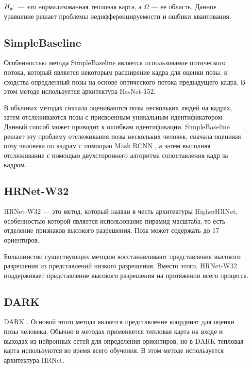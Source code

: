 $H_k`$ --- это нормализованная тепловая карта, а $\Omega$ --- ее область. Данное уравнение решает проблемы недифференцируемости и ошбики квантования.

\subsection{SimpleBaseline}

Особенностью метода SimpleBaseline \cite{xiao2018simple} является использование оптического потока, который является некоторым расширение кадра для оценки позы, и сходства опредленный позы на основе оптического потока предыдущего кадра. В этом методе используется архитектура ResNet-152.

В обычных методах сначала оцениваются позы нескольких людей на кадрах, затем отслеживаются позы с присвоенным уникальным идентификатором. Данный способ может приводит к ошибкам идентификации. SimpleBaseline решает эту проблему отслеживания позы нескольких человек, сначала оценивая позу человека по кадрам с помощью Mask RCNN \cite{matterport_maskrcnn_2017}, а затем выполняя отслеживание с помощью двухстороннего алгоритма сопоставления кадр за кадром.

\subsection{HRNet-W32}

HRNet-W32 \cite{sun2019deep} --- это метод, который назван в честь архитектуры HigherHRNet, особенностью которой является использование пирамид масштаба, то есть отделение признаков высокого разрешения. Поза может содержать до 17 ориентиров.

Большинство существующих методов восстанавливают представления высокого разрешения из представлений низкого разрешения. Вместо этого, HRNet-W32 поддерживает представление высокого разрешения на протяжении всего процесса.   

\subsection{DARK}

DARK \cite{Zhang_2020_CVPR}. Основой этого метода является представление координат для оценки позы человека. Обычно в методах применяется тепловая карта на входе и выходах из нейронных сетей для определения ориентиров, но в DARK тепловая карта используются во время всего обучения. В этом методе используется архитектура HRNet.

